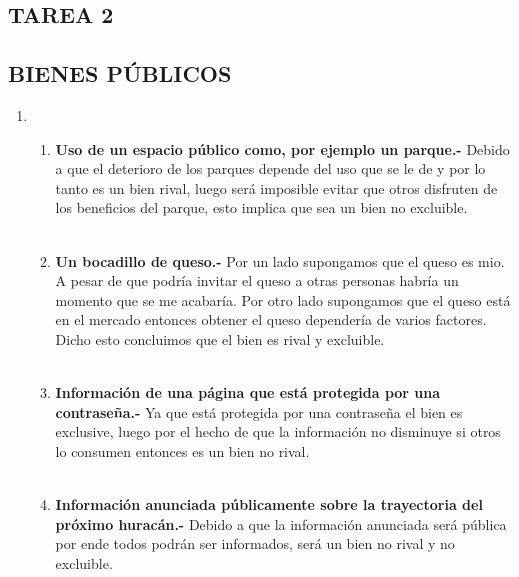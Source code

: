 \subsection*{\center TAREA 2}
\vspace{.4cm}
\subsection*{\center BIENES PÚBLICOS}
\vspace{1cm}

\begin{enumerate}

    \item 

    \begin{enumerate}[\bfseries a.]

	\item \textbf{Uso de un espacio público como, por ejemplo un parque.-} Debido a que el deterioro de los parques depende del uso que se le de y por lo tanto es un bien rival, luego será imposible evitar que otros disfruten de los beneficios del parque, esto implica que sea un bien no excluible.\\\\

	\item \textbf{Un bocadillo de queso.-} Por un lado supongamos que el queso es mio. A pesar de que podría invitar el queso a otras personas habría un momento que se me acabaría. Por otro lado supongamos que el queso está en el mercado entonces obtener el queso dependería de varios factores. Dicho esto concluimos que el bien es rival y excluible.\\\\

	\item \textbf{Información de una página que está protegida por una contraseña.-} Ya que está protegida por una contraseña el bien es exclusive, luego por el hecho de que la información no disminuye si otros lo consumen entonces es un bien no rival.\\\\

	\item \textbf{Información anunciada públicamente sobre la trayectoria del próximo huracán.-} Debido a que la información anunciada será pública por ende todos podrán ser informados, será un bien no rival y no excluible.\\\\


\end{enumerate}
\end{enumerate}
